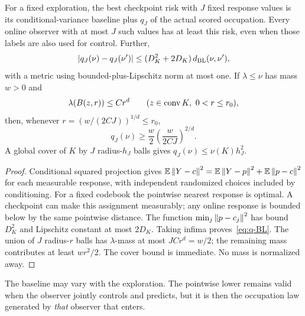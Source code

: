 \begin{lemma}\label{lem:quantization}
For a fixed exploration, the best checkpoint risk with $J$ fixed response values is its conditional-variance baseline plus $q_J$ of the actual scored occupation. Every online observer with at most $J$ such values has at least this risk, even when those labels are also used for control. Further,
\begin{equation}\label{eq:q-BL}
 |q_J(\nu)-q_J(\nu')|
 \le(D_K^2+2D_K)\,d_{\rm BL}(\nu,\nu'),
\end{equation}
with a metric using bounded-plus-Lipschitz norm at most one. If $\lambda\le\nu$ has mass $w>0$ and
\[
 \lambda(B(z,r))\le C r^d\qquad(z\in\operatorname{conv} K,\ 0<r\le r_0),
\]
then, whenever $r=(w/(2CJ))^{1/d}\le r_0$,
\begin{equation}\label{eq:smallball}
 q_J(\nu)\ge\frac w2\left(\frac{w}{2CJ}\right)^{2/d}.
\end{equation}
A global cover of $K$ by $J$ radius-$h_J$ balls gives $q_J(\nu)\le\nu(K)h_J^2$.
\end{lemma}
\begin{proof}
Conditional squared projection gives
$\mathbb E\left\lVert Y-c\right\rVert^2=\mathbb E\left\lVert Y-p\right\rVert^2+\mathbb E\left\lVert p-c\right\rVert^2$ for each measurable response, with independent randomized choices included by conditioning. For a fixed codebook the pointwise nearest response is optimal. A checkpoint can make this assignment measurably; any online response is bounded below by the same pointwise distance. The function $\min_j\left\lVert p-c_j\right\rVert^2$ has bound $D_K^2$ and Lipschitz constant at most $2D_K$. Taking infima proves~\eqref{eq:q-BL}. The union of $J$ radius-$r$ balls has $\lambda$-mass at most $JCr^d=w/2$; the remaining mass contributes at least $wr^2/2$. The cover bound is immediate. No mass is normalized away.
\end{proof}
The baseline may vary with the exploration. The pointwise lower remains valid when the observer jointly controls and predicts, but it is then the occupation law generated by \emph{that} observer that enters.


